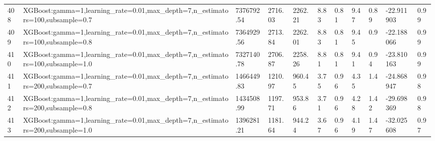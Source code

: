 \begin{longtable}{C{0.8cm} L{2cm} C{1.15cm} C{1.15cm} C{1.15cm} C{1.15cm} C{0.85cm} C{1.25cm} C{1.2cm} C{1.5cm} C{1.0cm}}
408 & XGBoost:\newline gamma=1,\newline learning\_rate=0.01,\newline max\_depth=7,\newline n\_estimators=100,\newline subsample=0.7 & 7376792.54 & 2716.03 & 2262.21 & 8.83 & 0.81 & 9.47 & 0.89 & -22.911903 & 0.99 \\
409 & XGBoost:\newline gamma=1,\newline learning\_rate=0.01,\newline max\_depth=7,\newline n\_estimators=100,\newline subsample=0.8 & 7364929.56 & 2713.84 & 2262.01 & 8.83 & 0.81 & 9.45 & 0.9 & -22.188066 & 0.99 \\
410 & XGBoost:\newline gamma=1,\newline learning\_rate=0.01,\newline max\_depth=7,\newline n\_estimators=100,\newline subsample=1.0 & 7327140.78 & 2706.87 & 2258.26 & 8.81 & 0.81 & 9.41 & 0.94 & -23.810163 & 0.99 \\
411 & XGBoost:\newline gamma=1,\newline learning\_rate=0.01,\newline max\_depth=7,\newline n\_estimators=200,\newline subsample=0.7 & 1466449.83 & 1210.97 & 960.45 & 3.75 & 0.96 & 4.35 & 1.4 & -24.868947 & 0.98 \\
412 & XGBoost:\newline gamma=1,\newline learning\_rate=0.01,\newline max\_depth=7,\newline n\_estimators=200,\newline subsample=0.8 & 1434508.99 & 1197.71 & 953.86 & 3.71 & 0.96 & 4.28 & 1.42 & -29.698369 & 0.98 \\
413 & XGBoost:\newline gamma=1,\newline learning\_rate=0.01,\newline max\_depth=7,\newline n\_estimators=200,\newline subsample=1.0 & 1396281.21 & 1181.64 & 944.24 & 3.67 & 0.96 & 4.19 & 1.47 & -32.025608 & 0.97 \\

\end{longtable}
